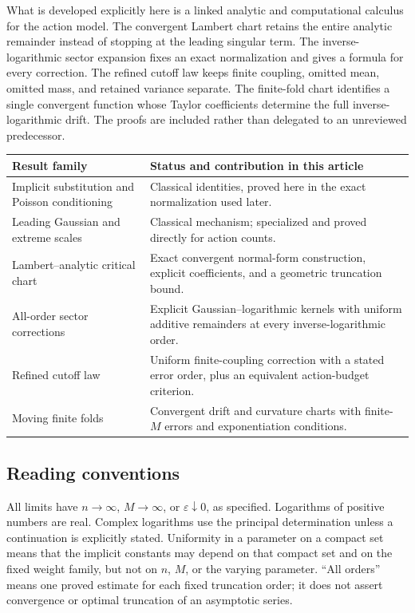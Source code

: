 \documentclass[11pt,a4paper]{article}
\numberwithin{equation}{section}
\theoremstyle{definition}
\theoremstyle{remark}
\newcommand{\eps}{\varepsilon}
\begin{document}
What is developed explicitly here is a linked analytic and computational
calculus for the action model. The convergent Lambert chart retains the
entire analytic remainder instead of stopping at the leading singular
term. The inverse-logarithmic sector expansion fixes an exact normalization
and gives a formula for every correction. The refined cutoff law keeps
finite coupling, omitted mean, omitted mass, and retained variance
separate. The finite-fold chart identifies a single convergent function
whose Taylor coefficients determine the full inverse-logarithmic drift.
The proofs are included rather than delegated to an unreviewed predecessor.

\begin{center}
\small
\begin{tabular}{>{\raggedright\arraybackslash}p{}>{\raggedright\arraybackslash}p{}}
\toprule
Result family & Status and contribution in this article\\
\midrule
Implicit substitution and Poisson conditioning & Classical identities, proved here in the exact normalization used later.\\
Leading Gaussian and extreme scales & Classical mechanism; specialized and proved directly for action counts.\\
Lambert--analytic critical chart & Exact convergent normal-form construction, explicit coefficients, and a geometric truncation bound.\\
All-order sector corrections & Explicit Gaussian--logarithmic kernels with uniform additive remainders at every inverse-logarithmic order.\\
Refined cutoff law & Uniform finite-coupling correction with a stated error order, plus an equivalent action-budget criterion.\\
Moving finite folds & Convergent drift and curvature charts with finite-$M$ errors and exponentiation conditions.\\
\bottomrule
\end{tabular}
\end{center}

\subsection{Reading conventions}
All limits have $n\to\infty$, $M\to\infty$, or $\eps\downarrow0$, as
specified. Logarithms of positive numbers are real. Complex logarithms use
the principal determination unless a continuation is explicitly stated.
Uniformity in a parameter on a compact set means that the implicit
constants may depend on that compact set and on the fixed weight family,
but not on $n$, $M$, or the varying parameter. ``All orders'' means one
proved estimate for each fixed truncation order; it does not assert
convergence or optimal truncation of an asymptotic series.
\end{document}
